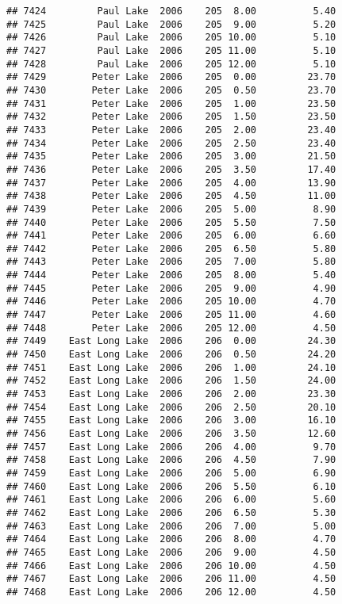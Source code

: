 \documentclass[
]{article}
\begin{document}
\begin{verbatim}
## 7424         Paul Lake  2006    205  8.00          5.40
## 7425         Paul Lake  2006    205  9.00          5.20
## 7426         Paul Lake  2006    205 10.00          5.10
## 7427         Paul Lake  2006    205 11.00          5.10
## 7428         Paul Lake  2006    205 12.00          5.10
## 7429        Peter Lake  2006    205  0.00         23.70
## 7430        Peter Lake  2006    205  0.50         23.70
## 7431        Peter Lake  2006    205  1.00         23.50
## 7432        Peter Lake  2006    205  1.50         23.50
## 7433        Peter Lake  2006    205  2.00         23.40
## 7434        Peter Lake  2006    205  2.50         23.40
## 7435        Peter Lake  2006    205  3.00         21.50
## 7436        Peter Lake  2006    205  3.50         17.40
## 7437        Peter Lake  2006    205  4.00         13.90
## 7438        Peter Lake  2006    205  4.50         11.00
## 7439        Peter Lake  2006    205  5.00          8.90
## 7440        Peter Lake  2006    205  5.50          7.50
## 7441        Peter Lake  2006    205  6.00          6.60
## 7442        Peter Lake  2006    205  6.50          5.80
## 7443        Peter Lake  2006    205  7.00          5.80
## 7444        Peter Lake  2006    205  8.00          5.40
## 7445        Peter Lake  2006    205  9.00          4.90
## 7446        Peter Lake  2006    205 10.00          4.70
## 7447        Peter Lake  2006    205 11.00          4.60
## 7448        Peter Lake  2006    205 12.00          4.50
## 7449    East Long Lake  2006    206  0.00         24.30
## 7450    East Long Lake  2006    206  0.50         24.20
## 7451    East Long Lake  2006    206  1.00         24.10
## 7452    East Long Lake  2006    206  1.50         24.00
## 7453    East Long Lake  2006    206  2.00         23.30
## 7454    East Long Lake  2006    206  2.50         20.10
## 7455    East Long Lake  2006    206  3.00         16.10
## 7456    East Long Lake  2006    206  3.50         12.60
## 7457    East Long Lake  2006    206  4.00          9.70
## 7458    East Long Lake  2006    206  4.50          7.90
## 7459    East Long Lake  2006    206  5.00          6.90
## 7460    East Long Lake  2006    206  5.50          6.10
## 7461    East Long Lake  2006    206  6.00          5.60
## 7462    East Long Lake  2006    206  6.50          5.30
## 7463    East Long Lake  2006    206  7.00          5.00
## 7464    East Long Lake  2006    206  8.00          4.70
## 7465    East Long Lake  2006    206  9.00          4.50
## 7466    East Long Lake  2006    206 10.00          4.50
## 7467    East Long Lake  2006    206 11.00          4.50
## 7468    East Long Lake  2006    206 12.00          4.50

\end{verbatim}
\end{document}
